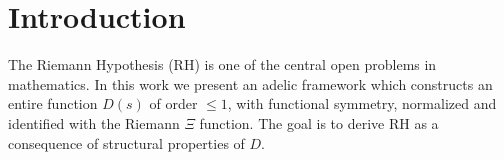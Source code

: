 \section{Introduction}

The Riemann Hypothesis (RH) is one of the central open problems in mathematics. 
In this work we present an adelic framework which constructs an entire function $D(s)$
of order $\leq 1$, with functional symmetry, normalized and identified with the Riemann $\Xi$ function.
The goal is to derive RH as a consequence of structural properties of $D$.
